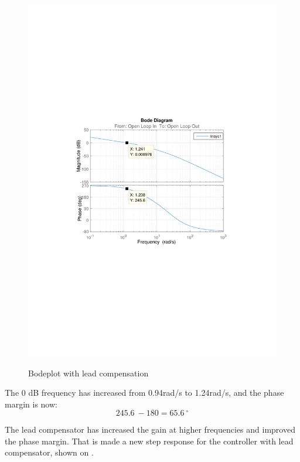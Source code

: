 \begin{figure}[H]
  \centering
  {
    \includegraphics[width=1.4\textwidth]{figures/distanceBode2.pdf}
  }
  \caption{Bodeplot with lead compensation}
  \label{SimulationSteeringB2}
\end{figure}
The 0 dB frequency has increased from \SI{0,94}{}rad/s to \SI{1,24}{}rad/s, and the phase margin is now: $$\SI{245,6}{}-180=\SI{65,6}{^\circ}$$

The lead compensator has increased the gain at higher frequencies and improved the phase margin. That is made a new step response for the controller with lead compensator, shown on .

